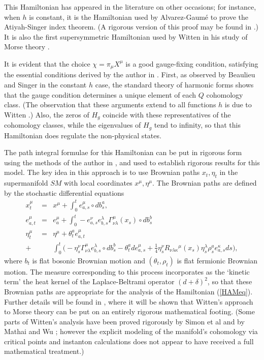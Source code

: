 \documentclass[a4paper,fleqn,12pt]{article}
\newcommand{\End}{\nonumber\\}
\newcommand{\Intot}{\int_{0}^{t}}
\newcommand{\Xmu}{x^{\mu}}
\newcommand{\XXmu}{X^{\mu}}
\newcommand{\Pimu}{\pi_{\mu}}
\newcommand{\Etamu}{\eta^{\mu}}
\newcommand{\Curv}[4]{R_{#1 #2 #3}{}^{#4}}
\newcommand{\Gam}[3]{\Gamma_{#1 #2}^{#3}}
\begin{document}
 \par
This Hamiltonian has appeared in the literature on  other
occasions; for instance, when $h$ is constant, it is the
Hamiltonian used by Alvarez-Gaum\'e \cite{Alvare} to prove the
Atiyah-Singer index theorem. (A rigorous version of this proof may
be found in \cite{SCSTWO}.) It is also the first supersymmetric
Hamiltonian used by Witten in his study of Morse theory
\cite{Witten82}.
 \par
It is  evident that the choice $\chi=\Pimu\XXmu$ is a good
gauge-fixing condition, satisfying the  essential conditions
derived by the author in \cite{GFBFVQ}. First, as observed by
Beaulieu and Singer in the constant $h$ case, the standard theory
of harmonic forms shows that the gauge condition determines a
unique element of each $Q$ cohomology class. (The observation that
these arguments extend to all functions $h$ is due to Witten
\cite{Witten82}.) Also, the zeros of $H_g$ coincide with these
representatives of the cohomology classes, while the eigenvalues
of $H_g$ tend to infinity, so that this Hamiltonian does regulate
the non-physical states.
 \par
The path integral formulae for this Hamiltonian can be put in
rigorous form using the methods of the author in
\cite{SCSTWO,JMPFI}, and used to establish rigorous results for
this model. The key idea in this approach is to use Brownian paths
$x_t,\eta_t$ in the supermanifold $SM$ with local coordinates
$\Xmu,\Etamu$. The Brownian paths are defined by the stochastic
differential  equations
 \begin{eqnarray}
  \Xmu_t &=& \Xmu + \Intot e^{\mu}_{a,s}\circ db^{a}_s , \End
  e^{\mu}_{a,t}&=& e^{\mu}_{a} +\Intot
   -e^{\nu}_{a,s} e^{\lambda}_{b,s}
   \Gam{\nu}{\lambda}{\mu}(x_s) \circ db^{b}_s \End
  \Etamu_t &=& \Etamu + \theta^{a}_t e^{\mu}_{a,t} \End
  +&&\!\!\!\!\!\!\!\!\! \Intot \big( - \eta^{\nu}_s \Gam{\nu}{\lambda}{\mu}
  e^{\lambda}_{b,s} \circ db^{b}_s - \theta^a_t de^{\mu}_{a,s}
  +\frac{1}{4}\eta^{\nu}_s \Curv{\nu}{\lambda}{\kappa}{\mu}
  (x_s)\eta^{\lambda}_s\rho^{a}_s e^{\kappa}_{a,s} ds \big),
 \end{eqnarray}
where $b_t$ is flat bosonic Brownian motion and $(\theta_t,\rho_t)$
is flat fermionic Brownian motion. The measure corresponding
to this process incorporates as the `kinetic term' the heat kernel
of the Laplace-Beltrami operator $(d+ \delta)^2$, so that these
Brownian paths are appropriate for the analysis of the Hamiltonian
(\ref{HAMeq}). Further details will be found in \cite{TOPP}, where
it will be shown that Witten's approach to Morse theory
\cite{Witten82} can be put on an entirely rigorous mathematical
footing. (Some parts of Witten's analysis have been proved
rigorously by Simon et al \cite{Simetal} and by Mathai and Wu
\cite{MatWu}; however the explicit modeling of the manifold's
cohomology via critical points and instanton calculations does not
appear to have received a full mathematical treatment.)
%
\end{document}
